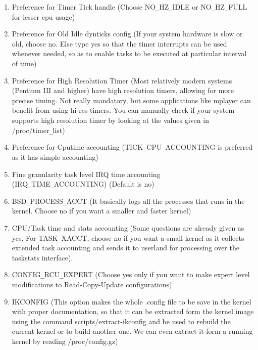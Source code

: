 \documentclass[12pt,a4paper]{article}
\begin{document}
\begin{enumerate}
\newline
\item Preference for Timer Tick handle (Choose NO\texttt{\_}HZ\texttt{\_}IDLE or NO\texttt{\_}HZ\texttt{\_}FULL for lesser cpu usage)
\newline
\item Preference for Old Idle dynticks config (If your system hardware is slow or old, choose no. Else type yes so that the timer interrupts can be used whenever needed, so as to enable tasks to be executed at particular interval of time)
\newline
\item Preference for High Resolution Timer (Most relatively modern systems (Pentium III and higher) have high resolution timers, allowing for more precise timing. Not really mandatory, but some applications like mplayer can benefit from using hi-res timers. You can manually check if your system supports high resolution timer by looking at the values given in /proc/timer\texttt{\_}list)
\newline
\item Preference for Cputime accounting (TICK\texttt{\_}CPU\texttt{\_}ACCOUNTING is preferred as it has simple accounting)
\newline
\item Fine granularity task level IRQ time accounting (IRQ\texttt{\_}TIME\texttt{\_}ACCOUNTING) (Default is no)
\newline
\item BSD\texttt{\_}PROCESS\texttt{\_}ACCT (It basically logs all the processes that runs in the kernel. Choose no if you want a smaller and faster kernel)
\newline
\item CPU/Task time and stats accounting (Some questions are already given as yes. For TASK\texttt{\_}XACCT, choose no if you want a small kernel as it collects extended task accounting and sends it to userland for processing over the taskstats interface).
\newline
\item CONFIG\texttt{\_}RCU\texttt{\_}EXPERT (Choose yes only if you want to make expert level modifications to Read-Copy-Update configurations)
\newline
\item IKCONFIG (This option makes the whole .config file to be save in the kernel with proper documentation, so that it can be extracted form the kernel image using the command scripts/extract-ikconfig and be used to rebuild the current kernel or to build another one. We can even extract it form a running kernel by reading /proc/config.gz)
\end{enumerate}\\
\end{document}
